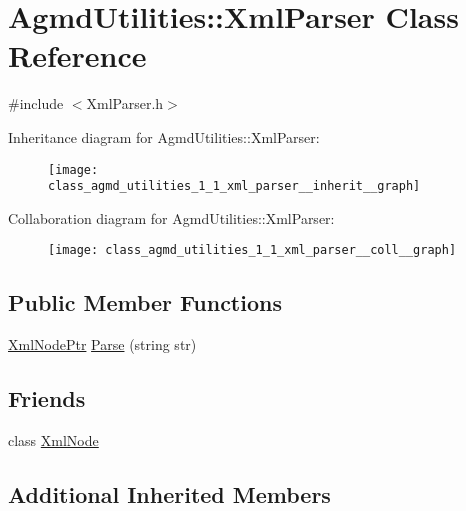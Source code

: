 \hypertarget{class_agmd_utilities_1_1_xml_parser}{\section{Agmd\+Utilities\+:\+:Xml\+Parser Class Reference}
\label{class_agmd_utilities_1_1_xml_parser}
}


{\ttfamily \#include $<$Xml\+Parser.\+h$>$}



Inheritance diagram for Agmd\+Utilities\+:\+:Xml\+Parser\+:\nopagebreak
\begin{figure}[H]
\begin{center}
\leavevmode
\texttt{[image: class\_agmd\_utilities\_1\_1\_xml\_parser\_\_inherit\_\_graph]}
\end{center}
\end{figure}


Collaboration diagram for Agmd\+Utilities\+:\+:Xml\+Parser\+:\nopagebreak
\begin{figure}[H]
\begin{center}
\leavevmode
\texttt{[image: class\_agmd\_utilities\_1\_1\_xml\_parser\_\_coll\_\_graph]}
\end{center}
\end{figure}
\subsection*{Public Member Functions}
\begin{DoxyCompactItemize}
\item 
\hyperlink{namespace_agmd_utilities_a5c62c53e06995bf0eddd56b55f44e62e}{Xml\+Node\+Ptr} \hyperlink{class_agmd_utilities_1_1_xml_parser_ac20435cc27a535ad7733b056757abb71}{Parse} (string str)
\end{DoxyCompactItemize}
\subsection*{Friends}
\begin{DoxyCompactItemize}
\item 
class \hyperlink{class_agmd_utilities_1_1_xml_parser_a88b009b38305b720f82e3bfc4695b70f}{Xml\+Node}
\end{DoxyCompactItemize}
\subsection*{Additional Inherited Members}


